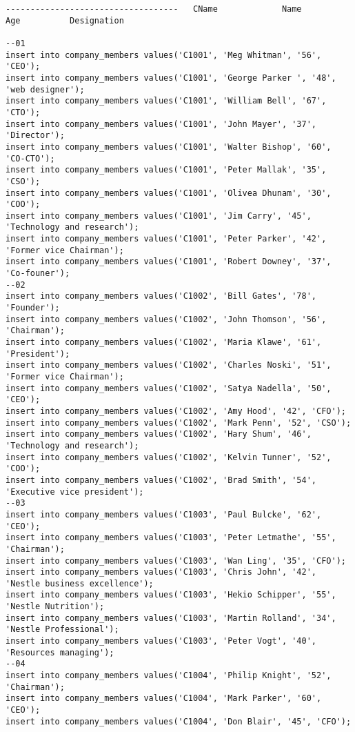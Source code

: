 \documentclass[a4,12pt]{report}
\begin{document}
\begin{lstlisting}
-----------------------------------   CName             Name           Age          Designation

--01
insert into company_members values('C1001', 'Meg Whitman', '56', 'CEO');
insert into company_members values('C1001', 'George Parker ', '48', 'web designer');
insert into company_members values('C1001', 'William Bell', '67', 'CTO');
insert into company_members values('C1001', 'John Mayer', '37', 'Director');
insert into company_members values('C1001', 'Walter Bishop', '60', 'CO-CTO');
insert into company_members values('C1001', 'Peter Mallak', '35', 'CSO');
insert into company_members values('C1001', 'Olivea Dhunam', '30', 'COO');
insert into company_members values('C1001', 'Jim Carry', '45', 'Technology and research');
insert into company_members values('C1001', 'Peter Parker', '42', 'Former vice Chairman');
insert into company_members values('C1001', 'Robert Downey', '37', 'Co-founer');
--02
insert into company_members values('C1002', 'Bill Gates', '78', 'Founder');
insert into company_members values('C1002', 'John Thomson', '56', 'Chairman');
insert into company_members values('C1002', 'Maria Klawe', '61', 'President');
insert into company_members values('C1002', 'Charles Noski', '51', 'Former vice Chairman');
insert into company_members values('C1002', 'Satya Nadella', '50', 'CEO');
insert into company_members values('C1002', 'Amy Hood', '42', 'CFO');
insert into company_members values('C1002', 'Mark Penn', '52', 'CSO');
insert into company_members values('C1002', 'Hary Shum', '46', 'Technology and research');
insert into company_members values('C1002', 'Kelvin Tunner', '52', 'COO');
insert into company_members values('C1002', 'Brad Smith', '54', 'Executive vice president');
--03
insert into company_members values('C1003', 'Paul Bulcke', '62', 'CEO');
insert into company_members values('C1003', 'Peter Letmathe', '55', 'Chairman');
insert into company_members values('C1003', 'Wan Ling', '35', 'CFO');
insert into company_members values('C1003', 'Chris John', '42', 'Nestle business excellence');
insert into company_members values('C1003', 'Hekio Schipper', '55', 'Nestle Nutrition');
insert into company_members values('C1003', 'Martin Rolland', '34', 'Nestle Professional');
insert into company_members values('C1003', 'Peter Vogt', '40', 'Resources managing');
--04
insert into company_members values('C1004', 'Philip Knight', '52', 'Chairman');
insert into company_members values('C1004', 'Mark Parker', '60', 'CEO');
insert into company_members values('C1004', 'Don Blair', '45', 'CFO');

\end{lstlisting}
\end{document}
